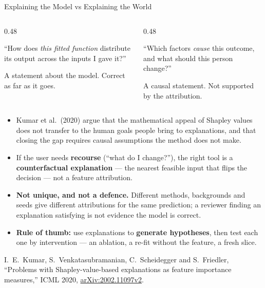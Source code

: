 \begin{frame}{Explaining the Model vs Explaining the World}

    \begin{columns}[T]
        \begin{column}{0.48\textwidth}
            \begin{tcolorbox}[colback=raiBlue!5, colframe=raiBlue!60, title=What SHAP answers]
                \scriptsize ``How does \emph{this fitted function} distribute its output across the
                inputs I gave it?''

                \vspace{0.12em}
                A statement about the model. Correct as far as it goes.
            \end{tcolorbox}
        \end{column}
        \begin{column}{0.48\textwidth}
            \begin{tcolorbox}[colback=raiRed!5, colframe=raiRed!70, title=What people hear]
                \scriptsize ``Which factors \emph{cause} this outcome, and what should this person
                change?''

                \vspace{0.12em}
                A causal statement. Not supported by the attribution.
            \end{tcolorbox}
        \end{column}
    \end{columns}

    \vspace{0.24em}

    \begin{itemize}\scriptsize
        \setlength\itemsep{0.1em}
        \item Kumar et al.\ (2020) argue that the mathematical appeal of Shapley values does not
              transfer to the human goals people bring to explanations, and that closing the gap
              requires causal assumptions the method does not make.
        \item If the user needs \textbf{recourse} (``what do I change?''), the right tool is a
              \textbf{counterfactual explanation} --- the nearest feasible input that flips the
              decision --- not a feature attribution.
        \item \textbf{Not unique, and not a defence.} Different methods, backgrounds and seeds give
              different attributions for the same prediction; a reviewer finding an explanation
              satisfying is not evidence the model is correct.
        \item \textbf{Rule of thumb:} use explanations to \textbf{generate hypotheses}, then test
              each one by intervention --- an ablation, a re-fit without the feature, a fresh slice.
    \end{itemize}

    \vspace{0.09em}
    {\scriptsize I.~E.~Kumar, S.~Venkatasubramanian, C.~Scheidegger and S.~Friedler, ``Problems with
    Shapley-value-based explanations as feature importance measures,'' ICML 2020,
    \href{https://arxiv.org/abs/2002.11097v2}{arXiv:2002.11097v2}.}
\end{frame}
